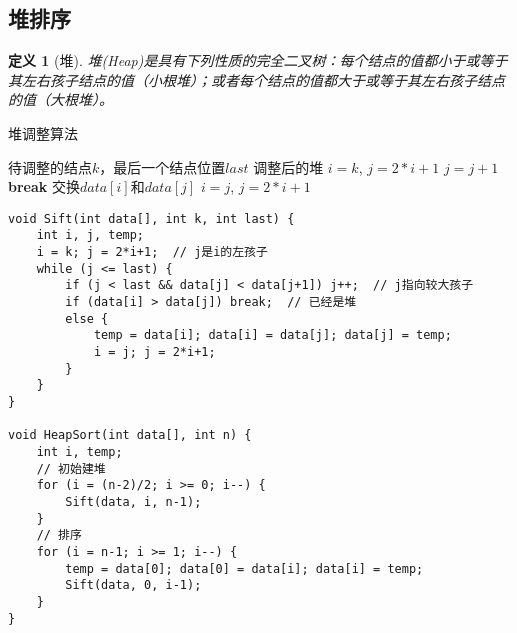 \documentclass[12pt,a4paper]{amsart}
\renewcommand{\COMMENT}[2][.5\linewidth]{%
  \leavevmode\hfill\makebox[#1][l]{//~#2}}
\newtheorem{definition}{定义}[section]
\begin{document}
\subsection{堆排序}

\begin{definition}[堆]
堆(Heap)是具有下列性质的完全二叉树：每个结点的值都小于或等于其左右孩子结点的值（小根堆）；或者每个结点的值都大于或等于其左右孩子结点的值（大根堆）。
\end{definition}

\begin{center}
\end{center}

\begin{algorithm}[H]
\caption{堆调整算法}
\begin{algorithmic}[1]
\REQUIRE 待调整的结点$k$，最后一个结点位置$last$
\ENSURE 调整后的堆
\STATE $i = k$, $j = 2*i+1$ \COMMENT{$j$是$i$的左孩子}
        \STATE $j = j + 1$ \COMMENT{$j$指向较大的孩子}
    \ENDIF
        \STATE \textbf{break} \COMMENT{已经是堆}
    \ELSE
        \STATE 交换$data[i]$和$data[j]$
        \STATE $i = j$, $j = 2*i+1$
    \ENDIF
\ENDWHILE
\end{algorithmic}
\end{algorithm}

\begin{lstlisting}[caption=堆排序实现]
void Sift(int data[], int k, int last) {
    int i, j, temp;
    i = k; j = 2*i+1;  // j是i的左孩子
    while (j <= last) {
        if (j < last && data[j] < data[j+1]) j++;  // j指向较大孩子
        if (data[i] > data[j]) break;  // 已经是堆
        else {
            temp = data[i]; data[i] = data[j]; data[j] = temp;
            i = j; j = 2*i+1;
        }
    }
}

void HeapSort(int data[], int n) {
    int i, temp;
    // 初始建堆
    for (i = (n-2)/2; i >= 0; i--) {
        Sift(data, i, n-1);
    }
    // 排序
    for (i = n-1; i >= 1; i--) {
        temp = data[0]; data[0] = data[i]; data[i] = temp;
        Sift(data, 0, i-1);
    }
}
\end{lstlisting}
\end{document}
